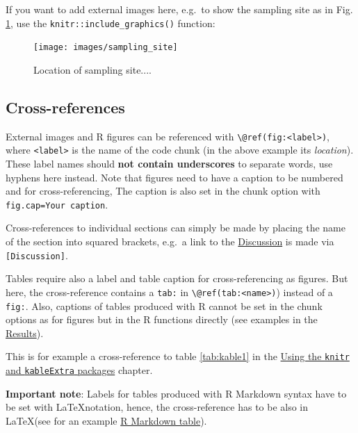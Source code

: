 \documentclass[a4paper,12pt]{article}
\begin{document}
If you want to add external images here, e.g.~to show the sampling site as in Fig. \ref{fig:location}, use the \texttt{knitr::include\_graphics()} function:
\begin{figure}

{\centering \texttt{[image: images/sampling\_site]} 

}

\caption{Location of sampling site....}\label{fig:location}
\end{figure}
\hypertarget{cross-references}{%
\subsection{Cross-references}\label{cross-references}}

External images and R figures can be referenced with \texttt{\textbackslash{}@ref(fig:\textless{}label\textgreater{})}, where \texttt{\textless{}label\textgreater{}} is the name of the code chunk (in the above example its \emph{location}). These label names should \textbf{not contain underscores} to separate words, use hyphens here instead. Note that figures need to have a caption to be numbered and for cross-referencing, The caption is also set in the chunk option with \texttt{fig.cap=\textquotesingle{}Your\ caption\textquotesingle{}}.

Cross-references to individual sections can simply be made by placing the name of the section into squared brackets, e.g.~a link to the \protect\hyperlink{discussion}{Discussion} is made via \texttt{{[}Discussion{]}}.

Tables require also a label and table caption for cross-referencing as figures. But here, the cross-reference contains a \texttt{tab:} in \texttt{\textbackslash{}@ref(tab:\textless{}name\textgreater{})}) instead of a \texttt{fig:}. Also, captions of tables produced with R cannot be set in the chunk options as for figures but in the R functions directly (see examples in the \protect\hyperlink{results}{Results}).

This is for example a cross-reference to table \ref{tab:kable1} in the \protect\hyperlink{using-the-knitr-and-kableextra-packages}{Using the \texttt{knitr} and \texttt{kableExtra} packages} chapter.

\textbf{Important note}: Labels for tables produced with R Markdown syntax have to be set with \LaTeX notation, hence, the cross-reference has to be also in \LaTeX (see for an example \protect\hyperlink{r-markdown-table}{R Markdown table}).
\end{document}
